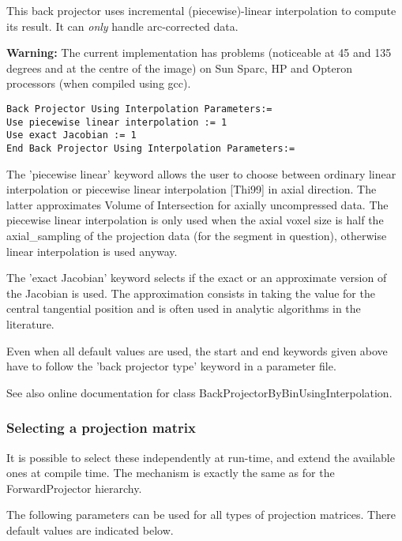 \documentclass{article}
\begin{document}
{ 
}

This back projector uses incremental (piecewise)-linear interpolation 
to compute its result. It can \textit{only} handle arc-corrected data.


\textbf{Warning:} The current implementation has problems (noticeable 
at 45 and 135 degrees and at the centre of the image) on Sun 
Sparc, HP and Opteron processors (when compiled using gcc).

{ 
}
\begin{verbatim}
Back Projector Using Interpolation Parameters:=
Use piecewise linear interpolation := 1
Use exact Jacobian := 1
End Back Projector Using Interpolation Parameters:=
\end{verbatim}

The 'piecewise linear' keyword allows the user to choose between 
ordinary linear interpolation or piecewise linear interpolation 
[Thi99] in axial direction. The latter approximates Volume of 
Intersection for axially uncompressed data. The piecewise linear 
interpolation is only used when the axial voxel size is half 
the axial\_sampling of the projection data (for the segment in 
question), otherwise linear interpolation is used anyway.


The 'exact Jacobian' keyword selects if the exact or an approximate 
version of the Jacobian is used. The approximation consists in 
taking the value for the central tangential position and is often 
used in analytic algorithms in the literature.


Even when all default values are used, the start and end keywords 
given above have to follow the 'back projector type' keyword 
in a parameter file.


See also online documentation for class BackProjectorByBinUsingInterpolation.



\subsubsection{
Selecting a projection matrix}
\label{sec:projmatrix}
It is possible to select these independently at run-time, and 
extend the available ones at compile time. The mechanism is exactly 
the same as for the ForwardProjector hierarchy.

{ 
}
\label{sec:projmatrixcommon}
The following parameters can be used for all types of projection 
matrices. There default values are indicated below.
\end{document}
